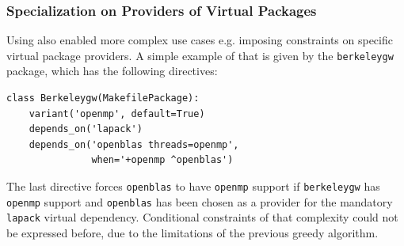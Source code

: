 \subsubsection{Specialization on Providers of Virtual Packages}
Using \clingo{} also enabled more complex use cases e.g. imposing constraints on specific virtual package providers. A simple example of that is given by the \texttt{berkeleygw} package, which has the following directives:

\begin{verbatim}
class Berkeleygw(MakefilePackage):
    variant('openmp', default=True)
    depends_on('lapack')
    depends_on('openblas threads=openmp',
               when='+openmp ^openblas')
\end{verbatim}

The last directive forces \texttt{openblas} to have \texttt{openmp} support if \texttt{berkeleygw} has \texttt{openmp} support and \texttt{openblas} has been chosen as a provider for the mandatory \texttt{lapack} virtual dependency. Conditional constraints of that complexity could not be expressed before, due to the limitations of the previous greedy algorithm.
